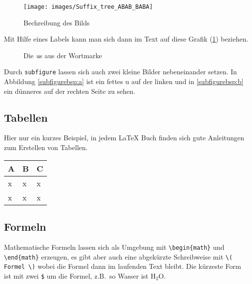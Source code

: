 \begin{figure}[ht]
    \centering
    \texttt{[image: images/Suffix\_tree\_ABAB\_BABA]}
    \caption{\label{anker}Bechreibung des Bilds}
\end{figure}

Mit Hilfe eines Labels kann man sich dann im Text auf diese Grafik (\ref{anker}) beziehen. 

\begin{figure}[ht]
    \centering
    \hspace{1cm}
    \caption{Die \emph{u}s aus der Wortmarke}
\end{figure}

Durch \verb|subfigure| lassen sich auch zwei kleine Bilder nebeneinander setzen. In Abbildung \ref{subfigurebsp:a} ist ein fettes u auf der linken und in \ref{subfigurebsp:b} ein dünneres auf der rechten Seite zu sehen.


\subsection{Tabellen}

Hier nur ein kurzes Beispiel, in jedem \LaTeX{} Buch finden sich gute Anleitungen zum Erstellen von Tabellen.

\begin{table}[h]
    \centering
    \begin{tabular}{|l|l|l|}
        A & B & C \\
        \hline
        x & x & x \\
        x & x & x
    \end{tabular}
\end{table}


\subsection{Formeln}

Mathematische Formeln lassen sich als Umgebung mit \verb|\begin{math}| und \verb|\end{math}| erzeugen, es gibt aber auch eine abgekürzte Schreibweise mit \verb|\( Formel \)| wobei die Formel dann im laufenden Text bleibt. Die kürzeste Form ist mit zwei \verb|$| um die Formel, z.B.~so Wasser ist H$_2$O.

